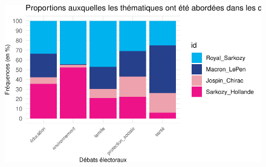 \documentclass[
  letterpaper,
  DIV=11,
  numbers=noendperiod]{scrartcl}
\begin{document}
\begin{figure}[H]

{\centering \includegraphics{Travail-Session_files/figure-pdf/unnamed-chunk-2-6.pdf}

}

\end{figure}
\end{document}
